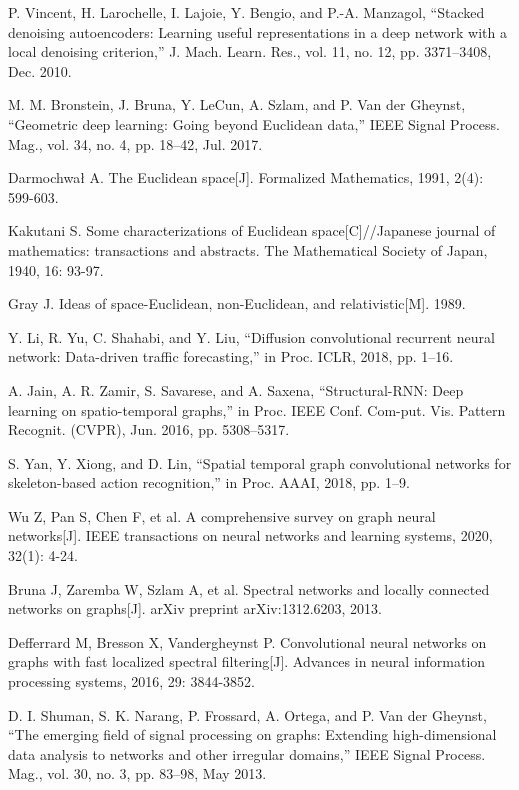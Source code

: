 \documentclass[10pt,journal,compsoc]{IEEEtran}
\begin{document}
\noindent
[8] P. Vincent, H. Larochelle, I. Lajoie, Y. Bengio, and P.-A. Manzagol, “Stacked denoising autoencoders: Learning useful representations in a deep network with a local denoising criterion,” J. Mach. Learn. Res., vol. 11, no. 12, pp. 3371–3408, Dec. 2010.

\noindent
[9] M. M. Bronstein, J. Bruna, Y. LeCun, A. Szlam, and P. Van der Gheynst, “Geometric deep learning: Going beyond Euclidean data,” IEEE Signal Process. Mag., vol. 34, no. 4, pp. 18–42, Jul. 2017.

\noindent
[10] Darmochwał A. The Euclidean space[J]. Formalized Mathematics, 1991, 2(4): 599-603.

\noindent
[11] Kakutani S. Some characterizations of Euclidean space[C]//Japanese journal of mathematics: transactions and abstracts. The Mathematical Society of Japan, 1940, 16: 93-97.

\noindent
[12] Gray J. Ideas of space-Euclidean, non-Euclidean, and relativistic[M]. 1989.

\noindent
[13] Y. Li, R. Yu, C. Shahabi, and Y. Liu, “Diffusion convolutional recurrent neural network: Data-driven traffic forecasting,” in Proc. ICLR, 2018, pp. 1–16.

\noindent
[14] A. Jain, A. R. Zamir, S. Savarese, and A. Saxena, “Structural-RNN: Deep learning on spatio-temporal graphs,” in Proc. IEEE Conf. Com-put. Vis. Pattern Recognit. (CVPR), Jun. 2016, pp. 5308–5317.

\noindent
[15] S. Yan, Y. Xiong, and D. Lin, “Spatial temporal graph convolutional networks for skeleton-based action recognition,” in Proc. AAAI, 2018, pp. 1–9.

\noindent
[16] Wu Z, Pan S, Chen F, et al. A comprehensive survey on graph neural networks[J]. IEEE transactions on neural networks and learning systems, 2020, 32(1): 4-24.

\noindent
[17] Bruna J, Zaremba W, Szlam A, et al. Spectral networks and locally connected networks on graphs[J]. arXiv preprint arXiv:1312.6203, 2013.

\noindent
[18] Defferrard M, Bresson X, Vandergheynst P. Convolutional neural networks on graphs with fast localized spectral filtering[J]. Advances in neural information processing systems, 2016, 29: 3844-3852.

\noindent
[19] D. I. Shuman, S. K. Narang, P. Frossard, A. Ortega, and P. Van der Gheynst, “The emerging field of signal processing on graphs: Extending high-dimensional data analysis to networks and other irregular domains,” IEEE Signal Process. Mag., vol. 30, no. 3, pp. 83–98, May 2013.
\end{document}
